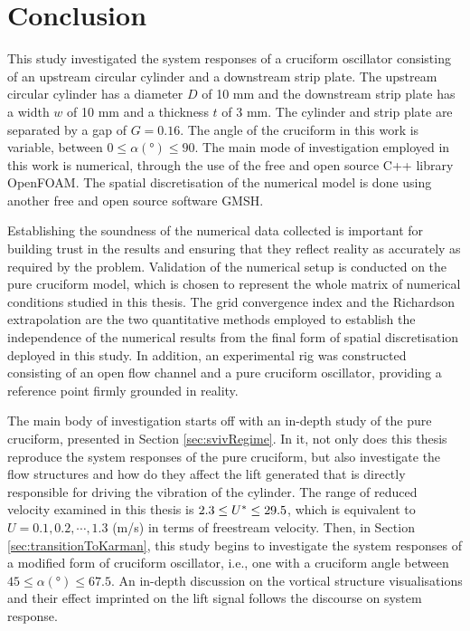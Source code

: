 \documentclass[oneside]{utmthesis}
\begin{document}

\chapter{Conclusion} \label{chap:conclusion}
This study investigated the system responses of a cruciform oscillator consisting of an upstream circular cylinder and a downstream strip plate. The upstream circular cylinder has a diameter $D$ of 10 mm and the downstream strip plate has a width $w$ of 10 mm and a thickness $t$ of 3 mm.  The cylinder and strip plate are separated by a gap of $G = 0.16$. The angle of the cruciform in this work is variable, between $0 \leq \alpha (\si{\degree}) \leq 90$. The main mode of investigation employed in this work is numerical, through the use of the free and open source C++ library OpenFOAM. The spatial discretisation of the numerical model is done using another free and open source software GMSH.

Establishing the soundness of the numerical data collected is important for building trust in the results and ensuring that they reflect reality as accurately as required by the problem. Validation of the numerical setup is conducted on the pure cruciform model, which is chosen to represent the whole matrix of numerical conditions studied in this thesis. The grid convergence index and the Richardson extrapolation are the two quantitative methods employed to establish the independence of the numerical results from the final form of spatial discretisation deployed in this study. In addition, an experimental rig was constructed consisting of an open flow channel and a pure cruciform oscillator, providing a reference point firmly grounded in reality.

The main body of investigation starts off with an in-depth study of the pure cruciform, presented in Section \ref{sec:svivRegime}. In it, not only does this thesis reproduce the system responses of the pure cruciform, but also investigate the flow structures and how do they affect the lift generated that is directly responsible for driving the vibration of the cylinder. The range of reduced velocity examined in this thesis is $2.3 \leq U^{*} \leq 29.5$, which is equivalent to $U = 0.1, 0.2, \cdots, 1.3$ (m/s) in terms of freestream velocity. Then, in Section \ref{sec:transitionToKarman}, this study begins to investigate the system responses of a modified form of cruciform oscillator, i.e., one with a cruciform angle between $45 \leq \alpha (\si{\degree}) \leq 67.5$. An in-depth discussion on the vortical structure visualisations and their effect imprinted on the lift signal follows the discourse on system response.
\end{document}
